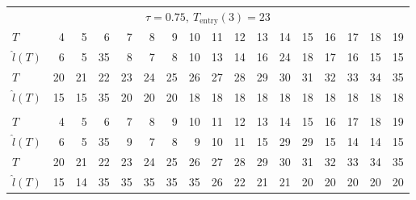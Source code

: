 \documentclass[12pt,a4paper]{article}
\begin{document}
\begin{landscape}
\begin{table}[htbp]
\begin{tabular*}{\linewidth}{@{\extracolsep{\fill}}lrrrrrrrrrrrrrrrr}
				\multicolumn{17}{c}{\textbf{$\tau=0.75,\ T_{\mathrm{entry}}(3)=23$}} \\
				\addlinespace[2.5pt]
				\midrule
				$T$ & 4 & 5 & 6 & 7 & 8 & 9 & 10 & 11 & 12 & 13 & 14 & 15 & 16 & 17 & 18 & 19 \\
				$\hat{l}(T)$ & 6 & 5 & 35 & 8 & 7 & 8 & 10 & 13 & 14 & 16 & 24 & 18 & 17 & 16 & 15 & 15 \\
				$T$ & 20 & 21 & 22 & 23 & 24 & 25 & 26 & 27 & 28 & 29 & 30 & 31 & 32 & 33 & 34 & 35 \\
				$\hat{l}(T)$ & 15 & 15 & 35 & 20 & 20 & 20 & 18 & 18 & 18 & 18 & 18 & 18 & 18 & 18 & 18 & 18 \\
				\midrule\addlinespace[2.5pt]
				\multicolumn{17}{c}{\textbf{$\tau=0.95,\ T_{\mathrm{entry}}(3)=28$}} \\
				\addlinespace[2.5pt]
				\midrule
				$T$ & 4 & 5 & 6 & 7 & 8 & 9 & 10 & 11 & 12 & 13 & 14 & 15 & 16 & 17 & 18 & 19 \\
				$\hat{l}(T)$ & 6 & 5 & 35 & 9 & 7 & 8 & 9 & 10 & 11 & 15 & 29 & 29 & 15 & 14 & 14 & 15 \\
				$T$ & 20 & 21 & 22 & 23 & 24 & 25 & 26 & 27 & 28 & 29 & 30 & 31 & 32 & 33 & 34 & 35 \\
				$\hat{l}(T)$ & 15 & 14 & 35 & 35 & 35 & 35 & 35 & 26 & 22 & 21 & 21 & 20 & 20 & 20 & 20 & 20 \\
				\bottomrule
			\end{tabular*}
		\end{table}
	\end{landscape}
	
\end{document}
